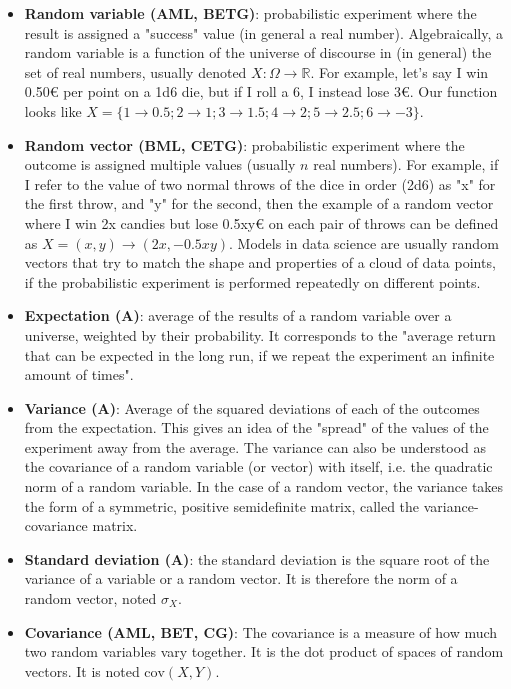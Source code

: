\documentclass{article}
\begin{document}
\begin{itemize}
	\item \textbf{Random variable (AML, BETG)}: probabilistic experiment where the result is assigned a "success" value (in general a real number). Algebraically, a random variable is a function of the universe of discourse in (in general) the set of real numbers, usually denoted $X : \Omega \rightarrow \mathbb{R}$. For example, let's say I win 0.50€ per point on a 1d6 die, but if I roll a 6, I instead lose 3€. Our function looks like $X = \{ 1 \rightarrow 0.5 ; 2 \rightarrow 1 ; 3 \rightarrow 1.5 ; 4 \rightarrow 2 ; 5 \rightarrow 2.5 ; 6 \rightarrow -3 \}$.

	\item \textbf{Random vector (BML, CETG)}: probabilistic experiment where the outcome is assigned multiple values (usually $n$ real numbers). For example, if I refer to the value of two normal throws of the dice in order (2d6) as "x" for the first throw, and "y" for the second, then the example of a random vector where I win 2x candies but lose 0.5xy€ on each pair of throws can be defined as $X = (x, y) \rightarrow (2x, -0.5xy)$. Models in data science are usually random vectors that try to match the shape and properties of a cloud of data points, if the probabilistic experiment is performed repeatedly on different points.

	\item \textbf{Expectation (A)}: average of the results of a random variable over a universe, weighted by their probability. It corresponds to the "average return that can be expected in the long run, if we repeat the experiment an infinite amount of times".

	\item \textbf{Variance (A)}: Average of the squared deviations of each of the outcomes from the expectation. This gives an idea of the "spread" of the values of the experiment away from the average. The variance can also be understood as the covariance of a random variable (or vector) with itself, i.e. the quadratic norm of a random variable. In the case of a random vector, the variance takes the form of a symmetric, positive semidefinite matrix, called the variance-covariance matrix.

	\item \textbf{Standard deviation (A)}: the standard deviation is the square root of the variance of a variable or a random vector. It is therefore the norm of a random vector, noted $\sigma_X$.

	\item \textbf{Covariance (AML, BET, CG)}: The covariance is a measure of how much two random variables vary together. It is the dot product of spaces of random vectors. It is noted $\text{cov}(X, Y)$.


\end{itemize}
\end{document}
